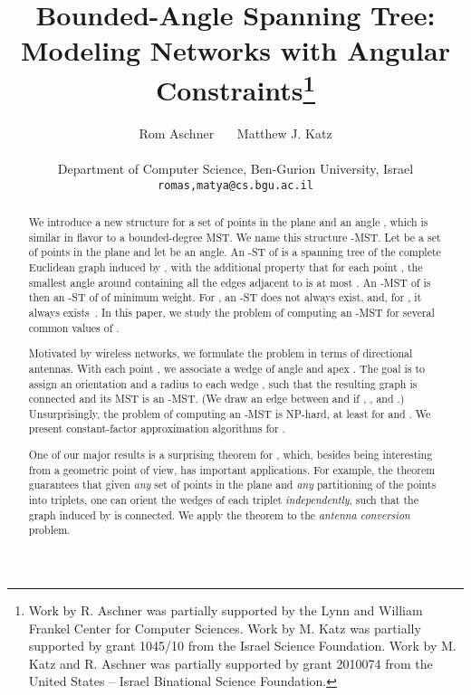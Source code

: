 \documentclass[11pt]{article}
\begin{document}
\title{Bounded-Angle Spanning Tree: Modeling Networks with Angular Constraints\thanks{Work by R. Aschner was partially supported by the Lynn and William Frankel Center for Computer Sciences. Work by M. Katz was partially supported by grant 1045/10 from the Israel Science Foundation. Work by M. Katz and R. Aschner was partially supported by grant 2010074 from the United States -- Israel Binational Science Foundation.}
}


\author{Rom Aschner \ \ \  Matthew J. Katz
\\
\\
{\small Department of Computer Science, Ben-Gurion University, Israel} \\
{\small {\tt romas,matya@cs.bgu.ac.il}}
}



\maketitle


\begin{abstract} 
We introduce a new structure for a set of points in the plane and an angle , which is similar in flavor to a bounded-degree MST. We name this structure -MST. 
Let  be a set of points in the plane and let  be an angle. An -ST of  is a spanning tree of the complete Euclidean graph induced by , with the additional property that for each point , the smallest angle around  containing all the edges adjacent to  is at most . An -MST of  is then an -ST of  of minimum weight.
For , an -ST does not always exist, and, for , it always exists~\cite{AGP13,AHHHPSSV13,CKLR11}. In this paper, we study the problem of computing an -MST for several common values of .


Motivated by wireless networks, 
we formulate the problem in terms of directional antennas. With each point , we associate a wedge  of angle  and apex .
The goal is to assign an orientation and a radius  to each wedge , such that the resulting graph is connected and its MST is an -MST. (We draw an edge between  and  if , , and .)
Unsurprisingly, the problem of computing an -MST is NP-hard, at least for  and . We present constant-factor approximation algorithms for .

One of our major results is a surprising theorem for , which, besides being interesting from a geometric point of view, has important applications. For example, the theorem guarantees that 
given {\em any} set  of  points in the plane and {\em any} partitioning of the points into  triplets, one can orient the wedges of each triplet {\em independently}, such that the graph induced by  is connected. We apply the theorem to the {\em antenna conversion} problem.
\end{abstract}
\end{document}
